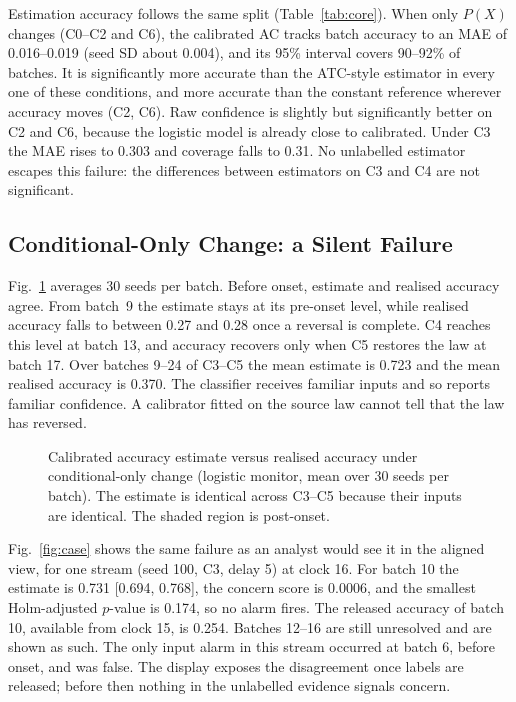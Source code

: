 Estimation accuracy follows the same split (Table~\ref{tab:core}). When only $P(X)$
changes (C0--C2 and C6), the calibrated AC tracks batch accuracy to an MAE of
0.016--0.019 (seed SD about 0.004), and its 95\% interval covers 90--92\% of batches.
It is significantly more accurate than the ATC-style estimator in every one of these
conditions, and more accurate than the constant reference wherever accuracy moves (C2,
C6). Raw confidence is slightly but significantly better on C2 and C6, because the
logistic model is already close to calibrated. Under C3 the MAE rises to 0.303 and
coverage falls to 0.31. No unlabelled estimator escapes this failure: the
differences between estimators on C3 and C4 are not significant.

\subsection{Conditional-Only Change: a Silent Failure}
\label{sec:res-conditional}
Fig.~\ref{fig:fail} averages 30 seeds per batch. Before onset, estimate and realised
accuracy agree. From batch~9 the estimate stays at its pre-onset level, while realised
accuracy falls to between 0.27 and 0.28 once a reversal is complete. C4 reaches this
level at batch 13, and accuracy recovers only when C5 restores the law at batch 17.
Over batches 9--24 of C3--C5 the mean estimate is 0.723 and the mean realised accuracy
is 0.370. The classifier receives familiar inputs and so reports familiar confidence.
A calibrator fitted on the source law cannot tell that the law has reversed.

\begin{figure}[t]
\centering
\resizebox{\columnwidth}{!}{}
\caption{Calibrated accuracy estimate versus realised accuracy under conditional-only change (logistic monitor, mean over 30 seeds per batch). The estimate is identical across C3--C5 because their inputs are identical. The shaded region is post-onset.}
\label{fig:fail}
\end{figure}

Fig.~\ref{fig:case} shows the same failure as an analyst would see it in the aligned
view, for one stream (seed 100, C3, delay 5) at clock 16. For batch 10 the estimate is
0.731 [0.694, 0.768], the concern score is 0.0006, and the smallest Holm-adjusted
$p$-value is 0.174, so no alarm fires. The released accuracy of batch 10, available
from clock 15, is 0.254. Batches 12--16 are still unresolved and are shown as such.
The only input alarm in this stream occurred at batch 6, before onset, and was false.
The display exposes the disagreement once labels are released; before then nothing in
the unlabelled evidence signals concern.

